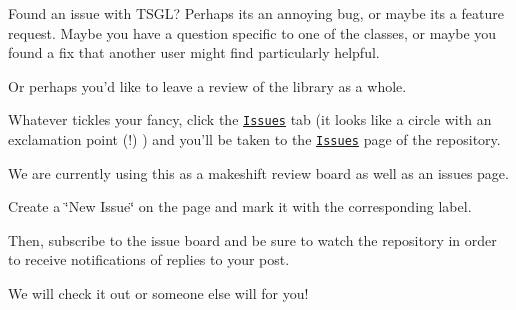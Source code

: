 Found an issue with T\-S\-G\-L? Perhaps its an annoying bug, or maybe its a feature request. Maybe you have a question specific to one of the classes, or maybe you found a fix that another user might find particularly helpful.

Or perhaps you'd like to leave a review of the library as a whole.

Whatever tickles your fancy, click the \href{https://github.com/Calvin-CS/TSGL/issues}{\tt Issues} tab (it looks like a circle with an exclamation point (!) ) and you'll be taken to the \href{https://github.com/Calvin-CS/TSGL/issues}{\tt Issues} page of the repository.

We are currently using this as a makeshift review board as well as an issues page.

Create a \char`\"{}\-New Issue\char`\"{} on the page and mark it with the corresponding label.

Then, subscribe to the issue board and be sure to watch the repository in order to receive notifications of replies to your post.

We will check it out or someone else will for you! 